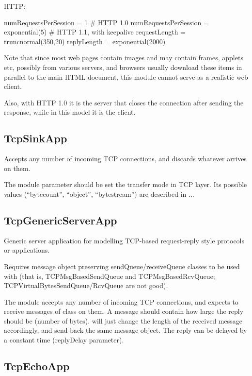 HTTP:

\begin{inifile}
numRequestsPerSession = 1 # HTTP 1.0
numRequestsPerSession = exponential(5)  # HTTP 1.1, with keepalive
requestLength = truncnormal(350,20)
replyLength = exponential(2000)
\end{inifile}

Note that since most web pages contain images and may contain frames,
applets etc, possibly from various servers, and browsers usually download
these items in parallel to the main HTML document, this module cannot
serve as a realistic web client.

Also, with HTTP 1.0 it is the server that closes the connection after
sending the response, while in this model it is the client.

\subsection{TcpSinkApp}

Accepts any number of incoming TCP connections, and discards whatever
arrives on them.

The module parameter  should be set the transfer mode in TCP layer.
Its possible values (``bytecount'', ``object'', ``bytestream'') are described in ...

\subsection{TcpGenericServerApp}

Generic server application for modelling TCP-based request-reply style
protocols or applications.

Requires message object preserving sendQueue/receiveQueue classes
to be used with  (that is, TCPMsgBasedSendQueue and TCPMsgBasedRcvQueue;
TCPVirtualBytesSendQueue/RcvQueue are not good).

The module accepts any number of incoming TCP connections, and expects
to receive messages of class  on them. A message should
contain how large the reply should be (number of bytes). 
will just change the length of the received message accordingly, and send
back the same message object. The reply can be delayed by a constant time
(replyDelay parameter).

\subsection{TcpEchoApp}

